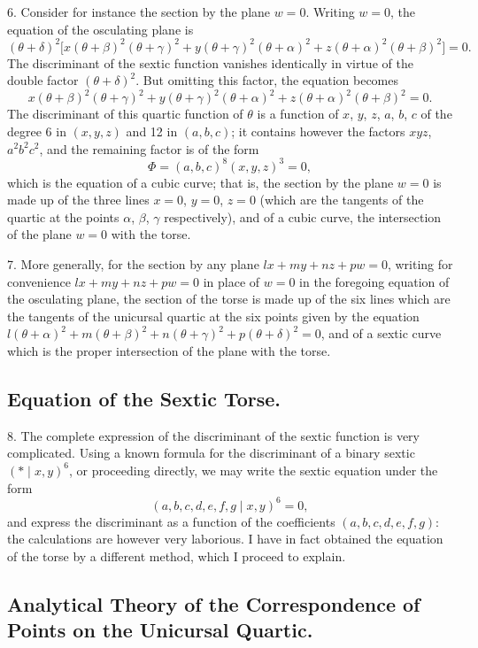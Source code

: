 \documentclass[11pt,a4paper]{article}
\begin{document}
6. Consider for instance the section by the plane $w = 0$. Writing $w = 0$, the equation of the osculating plane is
\[
(\theta + \delta)^2\bigl[x(\theta + \beta)^2(\theta + \gamma)^2 + y(\theta + \gamma)^2(\theta + \alpha)^2 + z(\theta + \alpha)^2(\theta + \beta)^2\bigr] = 0.
\]
The discriminant of the sextic function vanishes identically in virtue of the double factor $(\theta + \delta)^2$. But omitting this factor, the equation becomes
\[
x(\theta + \beta)^2(\theta + \gamma)^2 + y(\theta + \gamma)^2(\theta + \alpha)^2 + z(\theta + \alpha)^2(\theta + \beta)^2 = 0.
\]
The discriminant of this quartic function of $\theta$ is a function of $x$, $y$, $z$, $a$, $b$, $c$ of the degree 6 in $(x, y, z)$ and 12 in $(a, b, c)$; it contains however the factors $xyz$, $a^2b^2c^2$, and the remaining factor is of the form
\[
\Phi = (a, b, c)^8 (x, y, z)^3 = 0,
\]
which is the equation of a cubic curve; that is, the section by the plane $w = 0$ is made up of the three lines $x = 0$, $y = 0$, $z = 0$ (which are the tangents of the quartic at the points $\alpha$, $\beta$, $\gamma$ respectively), and of a cubic curve, the intersection of the plane $w = 0$ with the torse.

7. More generally, for the section by any plane $lx + my + nz + pw = 0$, writing for convenience $lx + my + nz + pw = 0$ in place of $w = 0$ in the foregoing equation of the osculating plane, the section of the torse is made up of the six lines which are the tangents of the unicursal quartic at the six points given by the equation $l(\theta + \alpha)^2 + m(\theta + \beta)^2 + n(\theta + \gamma)^2 + p(\theta + \delta)^2 = 0$, and of a sextic curve which is the proper intersection of the plane with the torse.

\subsection*{Equation of the Sextic Torse.}

8. The complete expression of the discriminant of the sextic function is very complicated. Using a known formula for the discriminant of a binary sextic $(\ast\mid x, y)^6$, or proceeding directly, we may write the sextic equation under the form
\[
(a, b, c, d, e, f, g\mid x, y)^6 = 0,
\]
and express the discriminant as a function of the coefficients $(a, b, c, d, e, f, g)$: the calculations are however very laborious. I have in fact obtained the equation of the torse by a different method, which I proceed to explain.

\subsection*{Analytical Theory of the Correspondence of Points on the Unicursal Quartic.}
\end{document}
